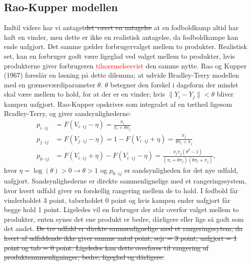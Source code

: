 \documentclass[11pt,a4paper]{article}
\begin{document}
\subsection{Rao-Kupper modellen}
Indtil videre har vi antaget\sout{det været en antagelse} at en fodboldkamp altid har haft en vinder, men dette er ikke en realistisk antagelse, da fodboldkampe kan ende uafgjort. Det samme gælder forbrugervalget mellem to produkter. Realistisk set, kan en forbruger godt være ligeglad ved valget mellem to produkter, hvis produkterne giver forbrugeren \textcolor{red}{tilnærmelsesvist} den samme nytte. Rao og Kupper (1967) \cite{RaoKupper} foreslår en løsning på dette dilemma; at udvide Bradley-Terry modellen med en grænseværdiparameter $\theta$. $\theta$ betegner den forskel i dagsform der mindst skal være mellem to hold, for at der er en vinder; hvis $\|Y_i-Y_j\| < \theta$ bliver kampen uafgjort. Rao-Kupper opskrives som integralet af en tæthed ligesom Bradley-Terry, og giver sandsynlighederne:
\begin{equation}
\begin{split}
    p_{i\cdot ij}&=F(V_{i\cdot ij}-\eta)=\frac{\pi_i}{\pi_i+\theta \pi_j}\\
    p_{j\cdot ij}&=F(V_{j\cdot ij}-\eta)=1-F(V_{i\cdot ij}+\eta)=\frac{\pi_j}{\theta \pi_i+\pi_j}\\
    p_{0\cdot ij}&=F(V_{i\cdot ij}+\eta)-F(V_{i\cdot ij}-\eta)= \frac{\pi_i \pi_j(\theta^2 -1)}{(\pi_i+\theta \pi_j)(\theta \pi_i + \pi_j)} \label{Sandynligheder},
\end{split}
\end{equation}
hvor $\eta=\log(\theta)>0 \rightarrow\theta>1$ og $p_{0\cdot ij}$ er sandsynligheden for det nye udfald, uafgjort. Sandsynlighederne er direkte sammenlignelige med et rangeringssystem, hvor hvert udfald giver en forskellig rangering mellem de to hold. I fodbold får vinderholdet 3 point, taberholdet 0 point og hvis kampen ender uafgjort får begge hold 1 point. Ligeledes vil en forbruger der står overfor valget mellem to produkter, enten synes det ene produkt er bedre, dårligere eller lige så godt som det andet. \sout{De tre udfald er direkte sammenlignelige med et rangeringssytem,  da hvert af udfaldende ikke giver samme antal point; sejr = 3 point, uafgjort = 1 point og tab = 0 point. Ligeledes kan dette overføres til rangering af produktsammenligninger; bedre, ligeglad og dårligere.}
\end{document}

